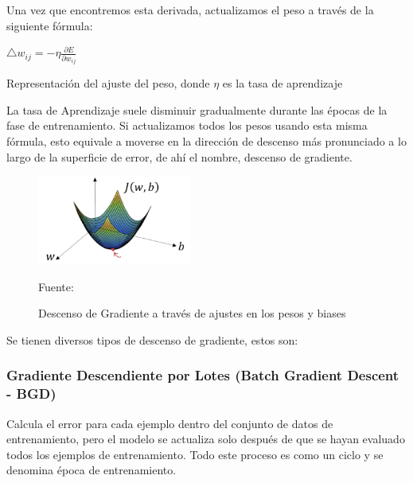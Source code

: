 		Una vez que encontremos esta derivada, actualizamos el peso a través de la siguiente fórmula:

		\begingroup\makeatletter{}\check@mathfonts
		\begin{center}
		$  \triangle w_{ij} = -\eta\frac{{\partial E}}{\partial w_{ij}} $
		\end{center}
		\begin{center}
		{\small{Representación del ajuste del peso, donde $\eta$ es la tasa de aprendizaje}}
		\end{center}
		\endgroup

		La tasa de Aprendizaje suele disminuir gradualmente durante las épocas de la fase de entrenamiento. Si actualizamos todos los pesos usando esta misma fórmula, esto equivale a moverse en la dirección de descenso más pronunciado a lo largo de la superficie de error, de ahí el nombre, descenso de gradiente.
		\begin{figure}[H]
		\begin{center}
		\includegraphics[width=0.45\textwidth]{images/desarrollo/entrenamiento/gradient}
		\end{center}
		\begin{center}
		\caption{\small{Descenso de Gradiente a través de ajustes en los pesos y biases}}
		\vspace{-0.5em}
		{\small{Fuente: \cite{gradientimg}}}
		\end{center}
		\vspace{-1.5em}
		\end{figure}

		Se tienen diversos tipos de descenso de gradiente, estos son:
		\subsubsection{Gradiente Descendiente por Lotes (Batch Gradient Descent - BGD)}
		
			Calcula el error para cada ejemplo dentro del conjunto de datos de entrenamiento, pero el modelo se actualiza solo después de que se hayan evaluado todos los ejemplos de entrenamiento. Todo este proceso es como un ciclo y se denomina época de entrenamiento.

